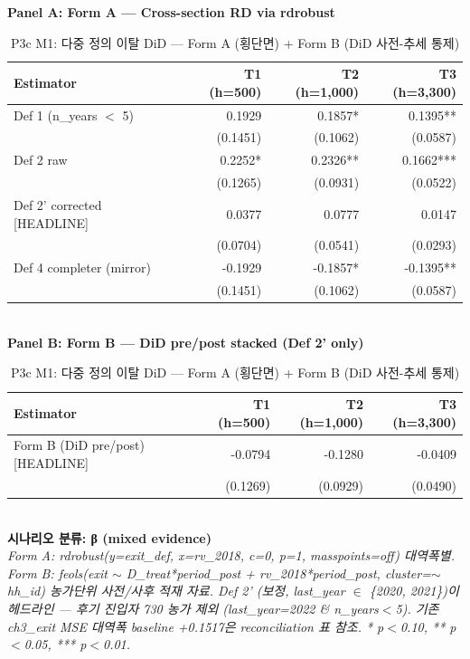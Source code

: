 \begin{table}[t]
\centering
\caption{P3c M1: 다중 정의 이탈 DiD — Form A (횡단면) + Form B (DiD 사전-추세 통제)}
\label{tab:ch5_exit_definitions_ko}
\textbf{Panel A: Form A — Cross-section RD via rdrobust}\\
\begin{tabular}{lrrr}
\toprule
Estimator & T1 (h=500) & T2 (h=1,000) & T3 (h=3,300) \\
\midrule
Def 1 (n_years $<$ 5) & 0.1929 & 0.1857* & 0.1395** \\
       & (0.1451) & (0.1062) & (0.0587) \\
Def 2 raw & 0.2252* & 0.2326** & 0.1662*** \\
       & (0.1265) & (0.0931) & (0.0522) \\
Def 2' corrected [HEADLINE] & 0.0377 & 0.0777 & 0.0147 \\
       & (0.0704) & (0.0541) & (0.0293) \\
Def 4 completer (mirror) & -0.1929 & -0.1857* & -0.1395** \\
       & (0.1451) & (0.1062) & (0.0587) \\
\bottomrule
\end{tabular}\\[1ex]
\textbf{Panel B: Form B — DiD pre/post stacked (Def 2' only)}\\
\begin{tabular}{lrrr}
\toprule
Estimator & T1 (h=500) & T2 (h=1,000) & T3 (h=3,300) \\
\midrule
Form B (DiD pre/post) [HEADLINE] & -0.0794 & -0.1280 & -0.0409 \\
                                  & (0.1269) & (0.0929) & (0.0490) \\
\bottomrule
\end{tabular}\\[1ex]
\textbf{시나리오 분류: β (mixed evidence)}\\
\footnotesize\textit{Form A: rdrobust(y=exit\_def, x=rv\_2018, c=0, p=1, masspoints=off) 대역폭별. Form B: feols(exit $\sim$ D\_treat*period\_post + rv\_2018*period\_post, cluster=$\sim$hh\_id) 농가단위 사전/사후 적재 자료. Def 2' (보정, last\_year $\in$ \{2020, 2021\})이 헤드라인 — 후기 진입자 730 농가 제외 (last\_year=2022 \& n\_years$<$5). 기존 ch3\_exit MSE 대역폭 baseline +0.1517은 reconciliation 표 참조. * p$<$0.10, ** p$<$0.05, *** p$<$0.01.}
\end{table}

